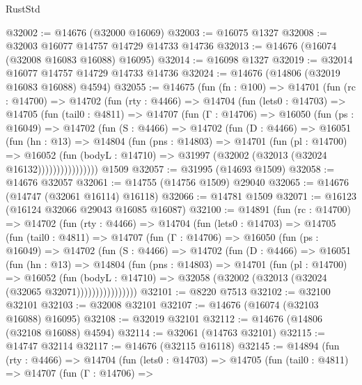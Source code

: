 \begin{lexlean}{RustStd}
\begin{coremodule}
@32002 := @14676 (@32000 @16069)
@32003 := @16075 @1327
@32008 := @32003 @16077 @14757 @14729 @14733 @14736
@32013 := @14676 (@16074 (@32008 @16083 @16088) @16095)
@32014 := @16098 @1327
@32019 := @32014 @16077 @14757 @14729 @14733 @14736
@32024 := @14676 (@14806 (@32019 @16083 @16088) @4594)
@32055 := @14675
    (fun (fn : @100) =>
    @14701
      (fun (rc : @14700) =>
      @14702
        (fun (rty : @4466) =>
        @14704
          (fun (lets0 : @14703) =>
          @14705
            (fun (tail0 : @4811) =>
            @14707
              (fun (Γ : @14706) =>
              @16050
                (fun (ps : @16049) =>
                @14702
                  (fun (S : @4466) =>
                  @14702
                    (fun (D : @4466) =>
                    @16051
                      (fun (hn : @13) =>
                      @14804
                        (fun (pns : @14803) =>
                        @14701
                          (fun (pl : @14700) =>
                          @16052
                            (fun (bodyL : @14710) =>
                            @31997 (@32002 (@32013 (@32024 @16132))))))))))))))))
    @1509
@32057 := @31995 (@14693 @1509)
@32058 := @14676 @32057
@32061 := @14755 (@14756 @1509) @29040
@32065 := @14676 (@14747 (@32061 @16114) @16118)
@32066 := @14781 @1509
@32071 := @16123 (@16124 @32066 @29043 @16085 @16087)
@32100 := @14891
    (fun (rc : @14700) =>
    @14702
      (fun (rty : @4466) =>
      @14704
        (fun (lets0 : @14703) =>
        @14705
          (fun (tail0 : @4811) =>
          @14707
            (fun (Γ : @14706) =>
            @16050
              (fun (ps : @16049) =>
              @14702
                (fun (S : @4466) =>
                @14702
                  (fun (D : @4466) =>
                  @16051
                    (fun (hn : @13) =>
                    @14804
                      (fun (pns : @14803) =>
                      @14701
                        (fun (pl : @14700) =>
                        @16052
                          (fun (bodyL : @14710) =>
                          @32058 (@32002 (@32013 (@32024 (@32065 @32071))))))))))))))))
@32101 := @8220 @7513
@32102 := @32100 @32101
@32103 := @32008 @32101
@32107 := @14676 (@16074 (@32103 @16088) @16095)
@32108 := @32019 @32101
@32112 := @14676 (@14806 (@32108 @16088) @4594)
@32114 := @32061 (@14763 @32101)
@32115 := @14747 @32114
@32117 := @14676 (@32115 @16118)
@32145 := @14894
    (fun (rty : @4466) =>
    @14704
      (fun (lets0 : @14703) =>
      @14705
        (fun (tail0 : @4811) =>
        @14707
          (fun (Γ : @14706) =>

\end{coremodule}
\end{lexlean}
